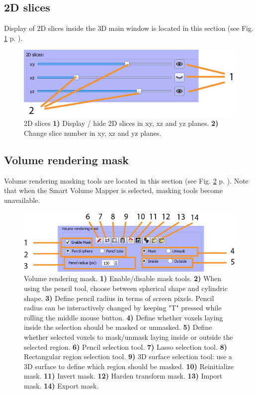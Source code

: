 \subsection{2D slices}
Display of 2D slices inside the 3D main window is located in this section (see Fig. \ref{volume_2Dslices} p. \pageref{volume_2Dslices}).
\begin{figure}
  \centering
  \includegraphics[scale=1]{images/14/volume_2Dslices2.png}
\caption{2D slices  \textbf{1)} Display / hide 2D slices in xy, xz and yz planes. \textbf{2)} Change slice number in xy, xz and yz planes.  }	
\label{volume_2Dslices}

 \end{figure}


\subsection{Volume rendering mask}\label{volume_rendering_masking}
Volume rendering masking tools are located in this section (see Fig. \ref{volume_masking} p. \pageref{volume_masking}). Note that when the Smart Volume Mapper is selected, masking tools become unavailable.
\begin{figure}
  \centering
  \includegraphics[scale=1]{images/14/volume_masking2.png}
\caption{Volume rendering mask.  \textbf{1)} Enable/disable mask tools. \textbf{2)} When using the pencil tool, choose between spherical shape and cylindric shape.  \textbf{3)} Define pencil radius in terms of screen pixels. Pencil radius can be interactively changed by keeping "T" pressed while rolling the middle mouse button.  \textbf{4)} Define whether voxels laying inside the selection should be masked or unmasked. \textbf{5)} Define whether selected voxels to mask/unmask laying inside or outside the selected region. \textbf{6)} Pencil selection tool. \textbf{7)} Lasso selection tool. \textbf{8)} Rectangular region selection tool.  \textbf{9)} 3D surface selection tool: use a 3D surface to define which region should be masked. \textbf{10)} Reinitialize mask. \textbf{11)} Invert mask. \textbf{12)} Harden transform mask. \textbf{13)} Import mask. \textbf{14)} Export mask.}	
\label{volume_masking}

 \end{figure}



